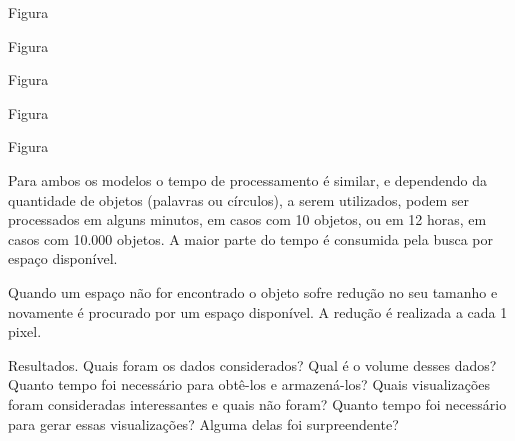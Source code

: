 \documentclass[12pt]{article}
\begin{document}
Figura


Figura


Figura


Figura


Figura



Para ambos os modelos o tempo de processamento é similar, e dependendo da quantidade de objetos (palavras ou círculos), a serem utilizados, podem ser processados em alguns minutos, em casos com 10 objetos, ou em 12 horas, em casos com 10.000 objetos. A maior parte do tempo é consumida pela busca por espaço disponível. 

Quando um espaço não for encontrado o objeto sofre redução no seu tamanho e novamente é procurado por um espaço disponível. A redução é realizada a cada 1 pixel. 




Resultados.
Quais foram os dados considerados? Qual é o volume desses dados? Quanto tempo foi
necessário para obtê-los e armazená-los? Quais visualizações foram consideradas interessantes e quais não
foram? Quanto tempo foi necessário para gerar essas visualizações? Alguma delas foi surpreendente?



\begin{thebibliography}{2}

\end{thebibliography}
\end{document}
